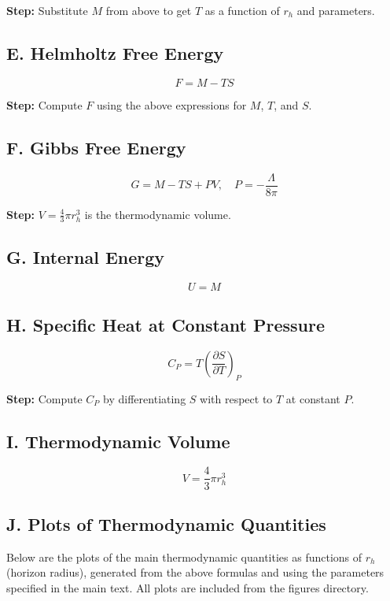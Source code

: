 \documentclass[12pt]{article}
\begin{document}
\textbf{Step:} Substitute $M$ from above to get $T$ as a function of $r_h$ and parameters.

\subsection*{E. Helmholtz Free Energy}
\begin{equation}
F = M - T S
\end{equation}

\textbf{Step:} Compute $F$ using the above expressions for $M$, $T$, and $S$.

\subsection*{F. Gibbs Free Energy}
\begin{equation}
G = M - T S + P V, \quad P = -\frac{\Lambda}{8\pi}
\end{equation}

\textbf{Step:} $V = \frac{4}{3} \pi r_h^3$ is the thermodynamic volume.

\subsection*{G. Internal Energy}
\begin{equation}
U = M
\end{equation}

\subsection*{H. Specific Heat at Constant Pressure}
\begin{equation}
C_P = T \left( \frac{\partial S}{\partial T} \right)_P
\end{equation}

\textbf{Step:} Compute $C_P$ by differentiating $S$ with respect to $T$ at constant $P$.

\subsection*{I. Thermodynamic Volume}
\begin{equation}
V = \frac{4}{3} \pi r_h^3
\end{equation}

\subsection*{J. Plots of Thermodynamic Quantities}
Below are the plots of the main thermodynamic quantities as functions of $r_h$ (horizon radius), generated from the above formulas and using the parameters specified in the main text. All plots are included from the figures directory.
\end{document}
